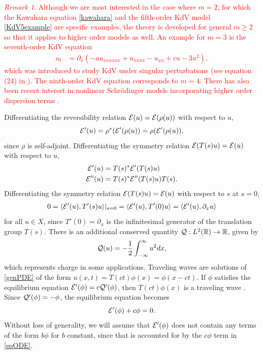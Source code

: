\documentclass[12pt]{elsarticle}
\theoremstyle{plain}
\theoremstyle{definition}
\theoremstyle{remark}
\newtheorem{remark}[theorem]{Remark}
\numberwithin{theorem}{section}
\numberwithin{equation}{section}
\newcommand{\revised}[1]{ \textcolor{red}{#1} }
\begin{document}
\revised{
\begin{remark}\label{remark:largerm}
Although we are most interested in the case where $m=2$, for which the Kawahara equation \cref{kawahara} and the fifth-order KdV model \cref{KdV5example} are specific examples, the theory is developed for general $m\geq 2$ so that it applies to higher order models as well. An example for $m=3$ is the seventh-order KdV equation \cite[Chapter 15.10]{Wazwaz2009}
\begin{align}\label{KdV7}
u_t &= \partial_x\left( -a u_{xxxxxx} + u_{xxxx} - u_{xx} + c u - 3 u^2\right),
\end{align}
which was introduced to study KdV under singular perturbations (see equation (24) in \cite{Pomeau1988}). The ninth-order KdV equation \cite[Chapter 15.10]{Wazwaz2009} corresponds to $m=4$. There has also been recent interest in nonlinear Schr\"{o}dinger models incorporating higher order dispersion terms \cite{Runge2020}.
\end{remark}
}

Differentiating the reversibility relation $\mathcal{E}(u) = \mathcal{E}(\rho(u))$ with respect to $u$,
\[
\mathcal{E}'(u) = \rho^*( \mathcal{E}'(\rho(u) ) = \rho( \mathcal{E}'(\rho(u) ),
\]
since $\rho$ is self-adjoint. Differentiating the symmetry relation $\mathcal{E}(T(s)u) = \mathcal{E}(u)$ with respect to $u$,
\begin{align}
\mathcal{E}'(u) &= T(s)^* \mathcal{E}'(T(s)u) \label{Eprimesymm} \\
\mathcal{E}''(u) &= T(s)^* \mathcal{E}''(T(s)u) T(s). \label{EHessiansymm}
\end{align}
Differentiating the symmetry relation $\mathcal{E}(T(s)u) = \mathcal{E}(u)$ with respect to $s$ at $s = 0$, 
\begin{align*}
0 = \langle \mathcal{E}'(u), T'(s) u \rangle|_{s = 0}
= \langle \mathcal{E}'(u), T'(0) u \rangle
= \langle \mathcal{E}'(u), \partial_x u \rangle
\end{align*}
for all $u \in X$, since $T'(0) = \partial_x$ is the infinitesimal generator of the translation group $T(s)$. There is an additional conserved quantity $\mathcal{Q}: L^2(\mathbb{R}) \rightarrow \mathbb{R}$, given by
\begin{equation}\label{defV}
\mathcal{Q}(u) = -\frac{1}{2} \int_{-\infty}^\infty u^2 dx,
\end{equation}
which represents charge in some applications. Traveling waves are solutions of \cref{genPDE} of the form $u(x, t) = T(ct)\phi(x) = \phi(x - ct)$. If $\phi$ satisfies the equilibrium equation $\mathcal{E}'(\phi) = c \mathcal{Q}'(\phi)$, then $T(ct)\phi(x)$ is a traveling wave \cite{Grillakis1987}. Since $\mathcal{Q}'(\phi) = -\phi$, the equilibrium equation becomes
\begin{equation}\label{eqODE}
\mathcal{E}'(\phi) + c \phi = 0.
\end{equation}
Without loss of generality, we will assume that $\mathcal{E}'(\phi)$ does not contain any terms of the form $b\phi$ for $b$ constant, since that is accounted for by the $c \phi$ term in \cref{eqODE}.
\end{document}
